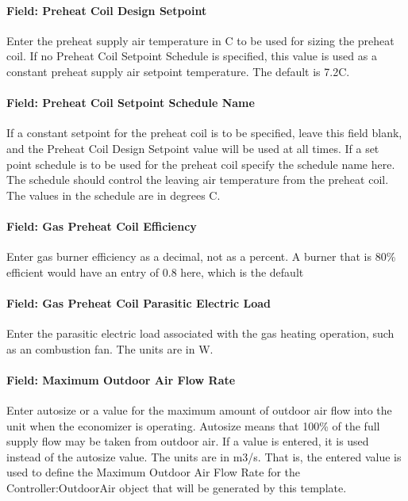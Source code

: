 \paragraph{Field: Preheat Coil Design Setpoint}\label{field-preheat-coil-design-setpoint-2}

Enter the preheat supply air temperature in C to be used for sizing the preheat coil. If no Preheat Coil Setpoint Schedule is specified, this value is used as a constant preheat supply air setpoint temperature. The default is 7.2C.

\paragraph{Field: Preheat Coil Setpoint Schedule Name}\label{field-preheat-coil-setpoint-schedule-name-2}

If a constant setpoint for the preheat coil is to be specified, leave this field blank, and the Preheat Coil Design Setpoint value will be used at all times. If a set point schedule is to be used for the preheat coil specify the schedule name here. The schedule should control the leaving air temperature from the preheat coil. The values in the schedule are in degrees C.

\paragraph{Field: Gas Preheat Coil Efficiency}\label{field-gas-preheat-coil-efficiency-2}

Enter gas burner efficiency as a decimal, not as a percent. A burner that is 80\% efficient would have an entry of 0.8 here, which is the default

\paragraph{Field: Gas Preheat Coil Parasitic Electric Load}\label{field-gas-preheat-coil-parasitic-electric-load-2}

Enter the parasitic electric load associated with the gas heating operation, such as an combustion fan. The units are in W.

\paragraph{Field: Maximum Outdoor Air Flow Rate}\label{field-maximum-outdoor-air-flow-rate-6}

Enter autosize or a value for the maximum amount of outdoor air flow into the unit when the economizer is operating. Autosize means that 100\% of the full supply flow may be taken from outdoor air. If a value is entered, it is used instead of the autosize value. The units are in m3/s. That is, the entered value is used to define the Maximum Outdoor Air Flow Rate for the Controller:OutdoorAir object that will be generated by this template.

